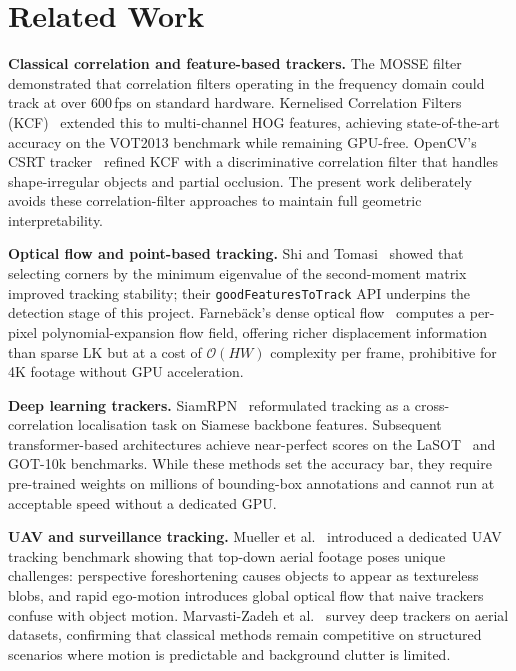 \documentclass[12pt,a4paper]{article}
\begin{document}
\section{Related Work}

\textbf{Classical correlation and feature-based trackers.}
The MOSSE filter~\cite{mosse} demonstrated that correlation filters operating in the frequency
domain could track at over 600\,fps on standard hardware. Kernelised Correlation Filters
(KCF)~\cite{kcf} extended this to multi-channel HOG features, achieving state-of-the-art
accuracy on the VOT2013 benchmark while remaining GPU-free. OpenCV's CSRT
tracker~\cite{csrt} refined KCF with a discriminative correlation filter that handles
shape-irregular objects and partial occlusion. The present work deliberately avoids these
correlation-filter approaches to maintain full geometric interpretability.

\textbf{Optical flow and point-based tracking.}
Shi and Tomasi~\cite{shitomasi} showed that selecting corners by the minimum eigenvalue
of the second-moment matrix improved tracking stability; their \texttt{goodFeaturesToTrack}
API underpins the detection stage of this project. Farneb\"{a}ck's dense optical
flow~\cite{farneback} computes a per-pixel polynomial-expansion flow field, offering richer
displacement information than sparse LK but at a cost of $\mathcal{O}(HW)$ complexity per
frame, prohibitive for 4K footage without GPU acceleration.

\textbf{Deep learning trackers.}
SiamRPN~\cite{siamrpn} reformulated tracking as a cross-correlation localisation task on
Siamese backbone features. Subsequent transformer-based architectures achieve near-perfect
scores on the LaSOT~\cite{lasot} and GOT-10k benchmarks. While these methods set the
accuracy bar, they require pre-trained weights on millions of bounding-box annotations and
cannot run at acceptable speed without a dedicated GPU.

\textbf{UAV and surveillance tracking.}
Mueller et al.~\cite{uavbenchmark} introduced a dedicated UAV tracking benchmark showing
that top-down aerial footage poses unique challenges: perspective foreshortening causes objects
to appear as textureless blobs, and rapid ego-motion introduces global optical flow that naive
trackers confuse with object motion. Marvasti-Zadeh et al.~\cite{marvasti} survey deep
trackers on aerial datasets, confirming that classical methods remain competitive on structured
scenarios where motion is predictable and background clutter is limited.
\end{document}
